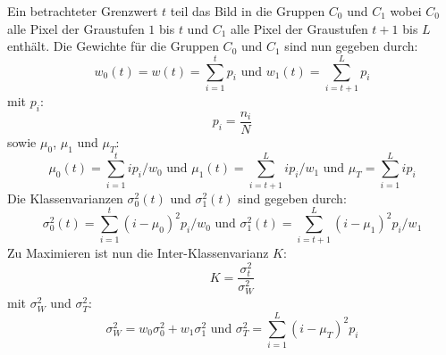 Ein betrachteter Grenzwert $t$ teil das Bild in die Gruppen $C_0$ und $C_1$ wobei $C_0$ alle Pixel der Graustufen $1$ bis $t$ und 
$C_1$ alle Pixel der Graustufen $t+1$ bis $L$ enthält. Die Gewichte für die Gruppen $C_0$ und $C_1$ sind nun gegeben durch:
\begin{equation}
    w_0(t) = w(t) = \sum_{i=1}^{t} p_i
    \text{   und   }
    w_1(t) = \sum_{i=t+1}^{L} p_i
\end{equation}
mit $p_i$: 
\begin{equation}
    p_i = \frac{n_i}{N}
\end{equation}
sowie $\mu_0$, $\mu_1$ und $\mu_T$:
\begin{equation}
    \mu_0(t) = \sum_{i=1}^{t} ip_i/w_0
    \text{   und   }
    \mu_1(t) = \sum_{i=t+1}^{L} ip_i/w_1
    \text{   und   }
    \mu_T = \sum_{i=1}^{L} ip_i
\end{equation}
Die Klassenvarianzen $\sigma_0^2(t)$ und $\sigma_1^2(t)$ sind gegeben durch:
\begin{equation}
    \sigma_0^2(t) =  \sum_{i=1}^{t} (i-\mu_0)^2p_i/w_0
    \text{   und   }
    \sigma_1^2(t) = \sum_{i=t+1}^{L} (i-\mu_1)^2p_i/w_1
\end{equation}
Zu Maximieren ist nun die Inter-Klassenvarianz $K$:
\begin{equation}
    K = \frac{\sigma_t^2}{\sigma_W^2}
\end{equation}
mit $\sigma_W^2$ und $\sigma_T^2$:
\begin{equation}
    \sigma_W^2 = w_0\sigma_0^2 + w_1\sigma_1^2
    \text{   und   }
    \sigma_T^2 = \sum_{i=1}^{L} (i-\mu_T)^2p_i
\end{equation}
